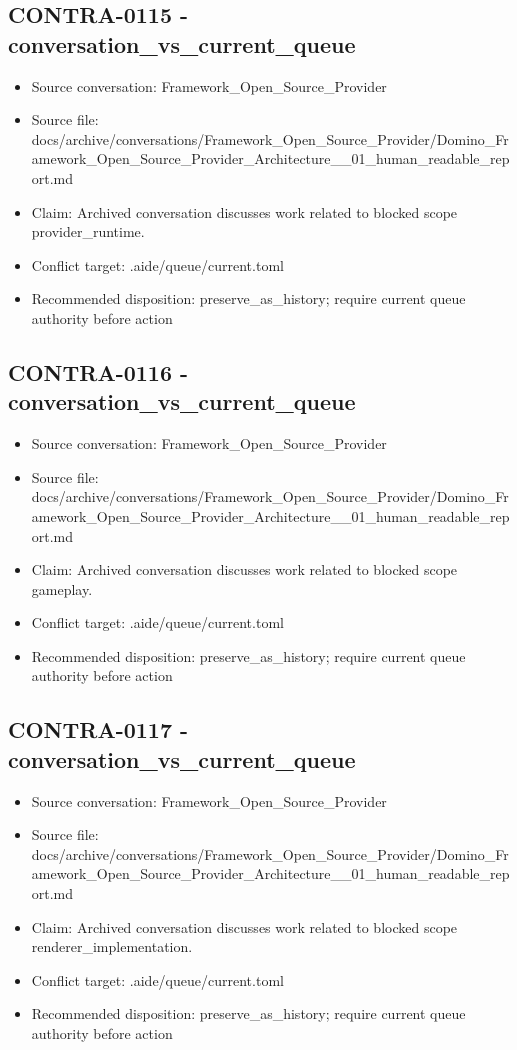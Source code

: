 \documentclass[11pt,a4paper]{report}
\begin{document}
\subsection{CONTRA-0115 - conversation\_vs\_current\_queue}

\begin{itemize}
\item Source conversation: Framework\_Open\_Source\_Provider
\item Source file: docs/archive/conversations/Framework\_Open\_Source\_Provider/Domino\_Framework\_Open\_Source\_Provider\_Architecture\_\_01\_human\_readable\_report.md
\item Claim: Archived conversation discusses work related to blocked scope provider\_runtime.
\item Conflict target: .aide/queue/current.toml
\item Recommended disposition: preserve\_as\_history; require current queue authority before action
\end{itemize}

\subsection{CONTRA-0116 - conversation\_vs\_current\_queue}

\begin{itemize}
\item Source conversation: Framework\_Open\_Source\_Provider
\item Source file: docs/archive/conversations/Framework\_Open\_Source\_Provider/Domino\_Framework\_Open\_Source\_Provider\_Architecture\_\_01\_human\_readable\_report.md
\item Claim: Archived conversation discusses work related to blocked scope gameplay.
\item Conflict target: .aide/queue/current.toml
\item Recommended disposition: preserve\_as\_history; require current queue authority before action
\end{itemize}

\subsection{CONTRA-0117 - conversation\_vs\_current\_queue}

\begin{itemize}
\item Source conversation: Framework\_Open\_Source\_Provider
\item Source file: docs/archive/conversations/Framework\_Open\_Source\_Provider/Domino\_Framework\_Open\_Source\_Provider\_Architecture\_\_01\_human\_readable\_report.md
\item Claim: Archived conversation discusses work related to blocked scope renderer\_implementation.
\item Conflict target: .aide/queue/current.toml
\item Recommended disposition: preserve\_as\_history; require current queue authority before action
\end{itemize}
\end{document}
